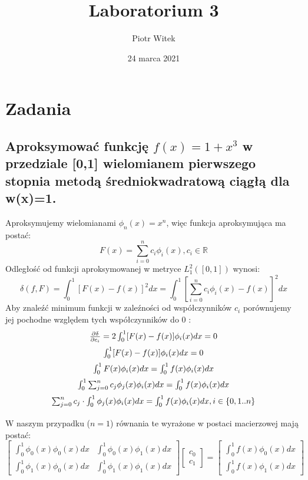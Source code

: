 \documentclass[5]{article}
\title{Laboratorium 3}
\author{Piotr Witek}
\date{24 marca 2021}
\begin{document}

\maketitle

\section{Zadania}

\subsection{Aproksymować funkcję $f(x) = 1+ x^{3}$ w przedziale [0,1] wielomianem pierwszego stopnia metodą średniokwadratową ciągłą dla w(x)=1.}


Aproksymujemy wielomianami $\phi_{n}(x)=x^{n}$, więc funkcja aproksymująca ma postać:
$$
F(x)=\sum_{i=0}^{n} c_{i} \phi_{i}(x), c_{i} \in \mathbb{R}
$$
Odległość od funkcji aproksymowanej w metryce $L_{1}^{2}([0,1])$ wynosi:
$$
\delta(f, F)=\int_{0}^{1}[F(x)-f(x)]^{2} d x=\int_{0}^{1}\left[\sum_{i=0}^{n} c_{i} \phi_{i}(x)-f(x)\right]^{2} d x
$$
Aby znaleźć minimum funkcji w zaleźności od współczynników $c_{i}$ porównujemy jej pochodne względem tych współczynników do 0 :
$$
\begin{array}{c}\vspace{2mm}
\frac{\partial \delta}{\partial c_{i}}=2 \int_{0}^{1}[F(x)-f(x)] \phi_{i}(x) d x=0 \\\vspace{2mm}
\int_{0}^{1}[F(x)-f(x)] \phi_{i}(x) d x=0 \\\vspace{2mm}
\int_{0}^{1} F(x) \phi_{i}(x) d x=\int_{0}^{1} f(x) \phi_{i}(x) d x \\\vspace{2mm}
\int_{0}^{1} \sum_{j=0}^{n} c_{j} \phi_{j}(x) \phi_{i}(x) d x=\int_{0}^{1} f(x) \phi_{i}(x) d x \\\vspace{2mm}
\sum_{j=0}^{n} c_{j} \cdot \int_{0}^{1} \phi_{j}(x) \phi_{i}(x) d x=\int_{0}^{1} f(x) \phi_{i}(x) d x, i \in\{0,1 . . n\}
\end{array}
$$
W naszym przypadku ($n=1$) równania te wyrażone w postaci macierzowej mają postać:
$$
\left[\begin{array}{ll}
\int_{0}^{1} \phi_{0}(x) \phi_{0}(x) d x & \int_{0}^{1} \phi_{0}(x) \phi_{1}(x) d x \\
\int_{0}^{1} \phi_{1}(x) \phi_{0}(x) d x & \int_{0}^{1} \phi_{1}(x) \phi_{1}(x) d x
\end{array}\right]\left[\begin{array}{c}
c_{0} \\
c_{1}
\end{array}\right]=\left[\begin{array}{c}
\int_{0}^{1} f(x) \phi_{0}(x) d x \\
\int_{0}^{1} f(x) \phi_{1}(x) d x
\end{array}\right]
$$
\end{document}
